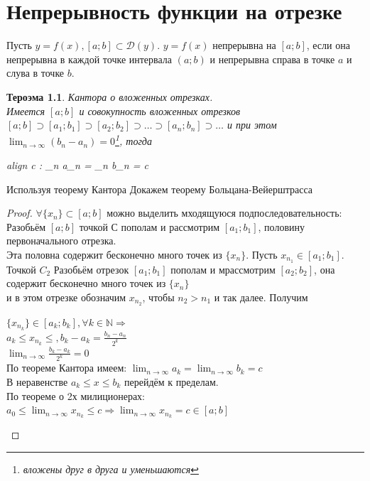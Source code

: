 \documentclass[oneside]{book}
\newcommand{\boxedeq}[2]{\begin{empheq}[box={\fboxsep=6pt\fbox}]{align}\label{#1}#2\end{empheq}}
\newtheorem{thm}{Тероэма}[chapter] %
\begin{document}
\chapter{Непрерывность функции на отрезке}
Пусть $y = f(x), [a;b] \subset \mathcal{D}(y)$. $y = f(x)$ непрерывна на $[a;b]$, если она непрерывна в каждой точке интервала $(a;b)$ и
непрерывна справа в точке $a$ и слува в точке $b$.
\begin{thm}
    Кантора о вложенных отрезках. \\
    Имеется $[a;b]$ и совокупность вложенных отрезков $[a;b] \supset [a_1;b_1] \supset [a_2;b_2] \supset \dots \supset [a_n; b_n]
    \supset \dots$ и при этом $\lim_{n \rightarrow \infty}{(b_n - a_n)} = 0$\footnote{вложены друг в друга и уменьшаются}, тогда
    \boxedeq{eq:*}{
        \exists c \in [a; b] : \lim_{n \rightarrow \infty}{a_n} = \lim_{n \rightarrow \infty}{b_n} = c
    }
\end{thm}
Используя теорему Кантора Докажем теорему Больцана-Вейерштрасса
\begin{proof}
    $\forall \{x_n\} \subset [a; b]$ можно выделить мходящуюся подпоследовательность:\\
    Разобьём $[a; b]$ точкой С пополам и рассмотрим $[a_1; b_1]$, половину первоначального отрезка.\\
    Эта половна содержит бесконечно много точек из $\{x_n\}$. Пусть $x_{n_1} \in [a_1; b_1]$. \\
    Точкой $C_2$ Разобьём отрезок $[a_1; b_1]$ пополам и мрассмотрим $[a_2; b_2]$, она содержит бесконечно много точек из $\{x_n\}$ \\
    и в этом отрезке обозначим $x_{n_2}$, чтобы $n_2 > n_1$ и так далее. Получим \\
    \begin{center}
        $\{x_{n_k}\} \in [a_k; b_k], \forall k \in \mathbb{N} \Rightarrow$ \\
        $a_k \leq x_{n_k} \leq, b_k - a_k = \frac{b_n - a_n}{2^k}$ \\
        $\lim_{n \rightarrow \infty}{\frac{b_k - a_k}{2^k} = 0}$ \\
        По теореме Кантора имеем: $\lim_{n \rightarrow \infty}{a_k} = \lim_{n \rightarrow \infty}{b_k} = c$\\
        В неравенстве $a_k \leq x \leq b_k$ перейдём к пределам.\\
        По теореме о 2х милиционерах:\\
        $a_0 \leq \lim_{n \rightarrow \infty}{x_{n_k}} \leq c \Rightarrow \lim_{n \rightarrow \infty}{x_{n_k}} = c \in [a; b]$
    \end{center}
\end{proof}
\end{document}
